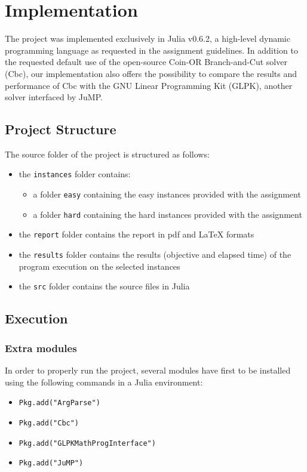 \newpage
\chapter{Implementation}

The project was implemented exclusively in Julia v0.6.2, a high-level dynamic programming language as requested in the assignment guidelines. In addition to the requested default use of the open-source Coin-OR Branch-and-Cut solver (Cbc), our implementation also offers the possibility to compare the results and performance of Cbc with the GNU Linear Programming Kit (GLPK), another solver interfaced by JuMP.

\section{Project Structure}

The source folder of the project is structured as follows:
\begin{itemize}
\item the \verb+instances+ folder contains:
	\begin{itemize}
	\item a folder \verb+easy+ containing the easy instances provided with the assignment
	\item a folder \verb+hard+ containing the hard instances provided with the assignment
	\end{itemize}
\item the \verb+report+ folder contains the report in pdf and LaTeX formats
\item the \verb+results+ folder contains the results (objective and elapsed time) of the program execution on the selected instances
\item the \verb+src+ folder contains the source files in Julia
\end{itemize}

\section{Execution}

\subsection{Extra modules}
In order to properly run the project, several modules have first to be installed using the following commands in a Julia environment:
\begin{itemize}
	\item \verb+Pkg.add("ArgParse")+
	\item \verb+Pkg.add("Cbc")+
	\item \verb+Pkg.add("GLPKMathProgInterface")+
	\item \verb+Pkg.add("JuMP")+
\end{itemize}

